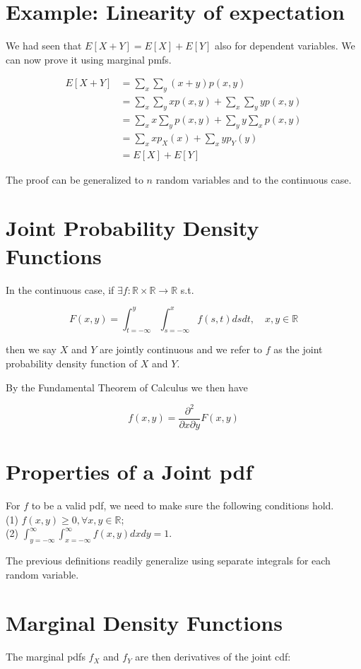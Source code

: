 \documentclass[10pt]{article}
\begin{document}
\section*{Example: Linearity of expectation}
We had seen that $E[X+Y]=E[X]+E[Y]$ also for dependent variables. We can now prove it using marginal pmfs.

$$
\begin{aligned}
E[X+Y] & =\sum_{x} \sum_{y}(x+y) p(x, y) \\
& =\sum_{x} \sum_{y} x p(x, y)+\sum_{x} \sum_{y} y p(x, y) \\
& =\sum_{x} x \sum_{y} p(x, y)+\sum_{y} y \sum_{x} p(x, y) \\
& =\sum_{x} x p_{X}(x)+\sum_{x} y p_{Y}(y) \\
& =E[X]+E[Y]
\end{aligned}
$$

The proof can be generalized to $n$ random variables and to the continuous case.

\section*{Joint Probability Density Functions}
In the continuous case, if $\exists f: \mathbb{R} \times \mathbb{R} \rightarrow \mathbb{R}$ s.t.

$$
F(x, y)=\int_{t=-\infty}^{y} \int_{s=-\infty}^{x} f(s, t) d s d t, \quad x, y \in \mathbb{R}
$$

then we say $X$ and $Y$ are jointly continuous and we refer to $f$ as the joint probability density function of $X$ and $Y$.

By the Fundamental Theorem of Calculus we then have

$$
f(x, y)=\frac{\partial^{2}}{\partial x \partial y} F(x, y)
$$

\section*{Properties of a Joint pdf}
For $f$ to be a valid pdf, we need to make sure the following conditions hold.\\
(1) $f(x, y) \geq 0, \forall x, y \in \mathbb{R}$;\\
(2) $\int_{y=-\infty}^{\infty} \int_{x=-\infty}^{\infty} f(x, y) d x d y=1$.

The previous definitions readily generalize using separate integrals for each random variable.

\section*{Marginal Density Functions}
The marginal pdfs $f_{X}$ and $f_{Y}$ are then derivatives of the joint cdf:
\end{document}

